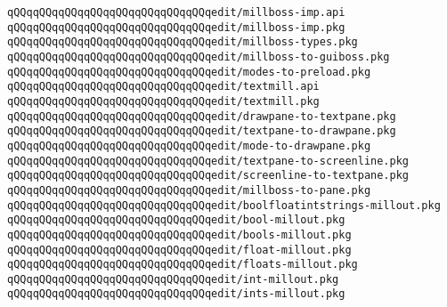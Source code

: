 \newline
\verb|qQQqqQQqqQQqqQQqqQQqqQQqqQQqqQQqedit/millboss-imp.api|\newline
\verb|qQQqqQQqqQQqqQQqqQQqqQQqqQQqqQQqedit/millboss-imp.pkg|\newline
\verb|qQQqqQQqqQQqqQQqqQQqqQQqqQQqqQQqedit/millboss-types.pkg|\newline
\verb|qQQqqQQqqQQqqQQqqQQqqQQqqQQqqQQqedit/millboss-to-guiboss.pkg|\newline
\newline
\newline
\verb|qQQqqQQqqQQqqQQqqQQqqQQqqQQqqQQqedit/modes-to-preload.pkg|\newline
\newline
\verb|qQQqqQQqqQQqqQQqqQQqqQQqqQQqqQQqedit/textmill.api|\newline
\verb|qQQqqQQqqQQqqQQqqQQqqQQqqQQqqQQqedit/textmill.pkg|\newline
\newline
\verb|qQQqqQQqqQQqqQQqqQQqqQQqqQQqqQQqedit/drawpane-to-textpane.pkg|\newline
\verb|qQQqqQQqqQQqqQQqqQQqqQQqqQQqqQQqedit/textpane-to-drawpane.pkg|\newline
\verb|qQQqqQQqqQQqqQQqqQQqqQQqqQQqqQQqedit/mode-to-drawpane.pkg|\newline
\newline
\verb|qQQqqQQqqQQqqQQqqQQqqQQqqQQqqQQqedit/textpane-to-screenline.pkg|\newline
\verb|qQQqqQQqqQQqqQQqqQQqqQQqqQQqqQQqedit/screenline-to-textpane.pkg|\newline
\newline
\verb|qQQqqQQqqQQqqQQqqQQqqQQqqQQqqQQqedit/millboss-to-pane.pkg|\newline
\newline
\verb|qQQqqQQqqQQqqQQqqQQqqQQqqQQqqQQqedit/boolfloatintstrings-millout.pkg|\newline
\verb|qQQqqQQqqQQqqQQqqQQqqQQqqQQqqQQqedit/bool-millout.pkg|\newline
\verb|qQQqqQQqqQQqqQQqqQQqqQQqqQQqqQQqedit/bools-millout.pkg|\newline
\verb|qQQqqQQqqQQqqQQqqQQqqQQqqQQqqQQqedit/float-millout.pkg|\newline
\verb|qQQqqQQqqQQqqQQqqQQqqQQqqQQqqQQqedit/floats-millout.pkg|\newline
\verb|qQQqqQQqqQQqqQQqqQQqqQQqqQQqqQQqedit/int-millout.pkg|\newline
\verb|qQQqqQQqqQQqqQQqqQQqqQQqqQQqqQQqedit/ints-millout.pkg|\newline
